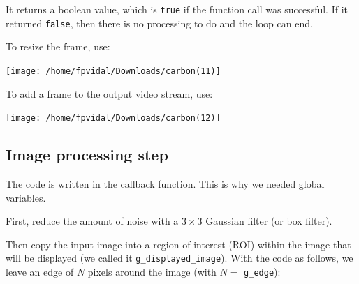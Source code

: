 \documentclass[english,a4paper,12pt,oneside]{article}
\begin{document}
It returns a boolean value, which is \verb+true+ if the function call was successful. 
If it returned \verb+false+, then there is no processing to do and the loop can end. 


To resize the frame, use:

\texttt{[image: /home/fpvidal/Downloads/carbon(11)]}

To add a frame to the output video stream, use:


\begin{center}
\texttt{[image: /home/fpvidal/Downloads/carbon(12)]}
\end{center}

%        
%




\subsection{Image processing step}

The code is written in the callback function. 
This is why we needed global variables. 

First, reduce the amount of noise with a $3 \times 3$ Gaussian filter (or box filter).

Then copy the input image into a region of interest (ROI) within the image that will be displayed (we called it \verb+g_displayed_image+). 
With the code as follows, we leave an edge of $N$ pixels around the image (with $N=$ \verb+g_edge+):
\end{document}
